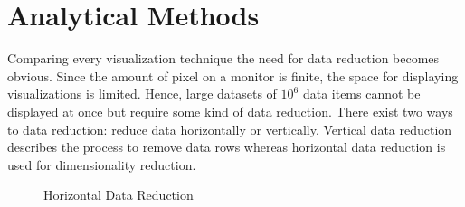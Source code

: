 \section{Analytical Methods}
Comparing every visualization technique the need for data reduction becomes obvious. Since the amount of pixel on a monitor is finite, the space for displaying visualizations is limited. Hence, large datasets of $10^6$ data items cannot be displayed at once but require some kind of data reduction\cite{FerreiradeOliveira2003,Aigner2011, Keim2005}. There exist two ways to data reduction: reduce data horizontally or vertically. 
Vertical data reduction describes the process to remove data rows whereas horizontal data reduction is used for dimensionality reduction. 
\begin{figure}[H]
    \centering
    \caption{Horizontal Data Reduction}
    \label{fig:my_label}
\end{figure}

